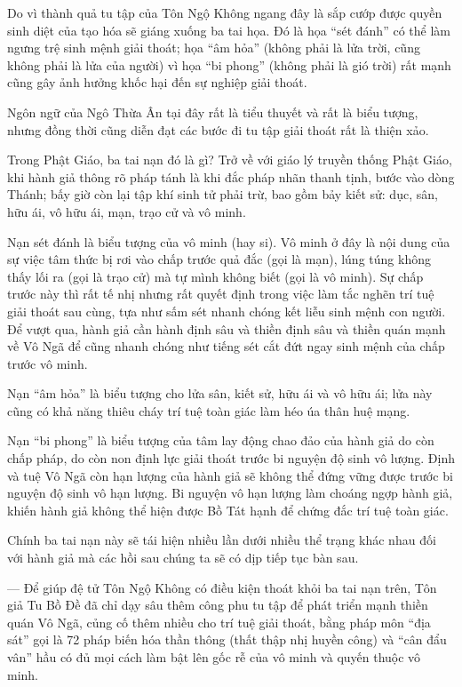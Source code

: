 Do vì thành quả tu tập của Tôn Ngộ Không ngang đây là sắp cướp được quyền sinh diệt của tạo hóa sẽ giáng xuống ba tai họa. Đó là họa ``sét đánh'' có thể làm ngưng trệ sinh mệnh giải thoát; họa ``âm hỏa'' (không phải là lửa trời, cũng không phải là lửa của người) vì họa ``bi phong'' (không phải là gió trời) rất mạnh cũng gây ảnh hưởng khốc hại đến sự nghiệp giải thoát.

Ngôn ngữ của Ngô Thừa Ân tại đây rất là tiểu thuyết và rất là biểu tượng, nhưng đồng thời cũng diễn đạt các bước đi tu tập giải thoát rất là thiện xảo.

Trong Phật Giáo, ba tai nạn đó là gì? Trở về với giáo lý truyền thống Phật Giáo, khi hành giả thông rõ pháp tánh là khi đắc pháp nhãn thanh tịnh, bước vào dòng Thánh; bấy giờ còn lại tập khí sinh tử phải trừ, bao gồm bảy kiết sử: dục, sân, hữu ái, vô hữu ái, mạn, trạo cử và vô minh.

Nạn sét đánh là biểu tượng của vô minh (hay si). Vô minh ở đây là nội dung của sự việc tâm thức bị rơi vào chấp trước quả đắc (gọi là mạn), lúng túng không thấy lối ra (gọi là trạo cử) mà tự mình không biết (gọi là vô minh). Sự chấp trước này thì rất tế nhị nhưng rất quyết định trong việc làm tắc nghẽn trí tuệ giải thoát sau cùng, tựa như sấm sét nhanh chóng kết liễu sinh mệnh con người. Để vượt qua, hành giả cần hành định sâu và thiền định sâu và thiền quán mạnh về Vô Ngã để cũng nhanh chóng như tiếng sét cắt đứt ngay sinh mệnh của chấp trước vô minh.

Nạn ``âm hỏa'' là biểu tượng cho lửa sân, kiết sử, hữu ái và vô hữu ái; lửa này cũng có khả năng thiêu cháy trí tuệ toàn giác làm héo úa thân huệ mạng.

Nạn ``bi phong'' là biểu tượng của tâm lay động chao đảo của hành giả do còn chấp pháp, do còn non định lực giải thoát trước bi nguyện độ sinh vô lượng. Định và tuệ Vô Ngã còn hạn lượng của hành giả sẽ không thể đứng vững được trước bi nguyện độ sinh vô hạn lượng. Bi nguyện vô hạn lượng làm choáng ngợp hành giả, khiến hành giả không thể hiện được Bồ Tát hạnh để chứng đắc trí tuệ toàn giác.

Chính ba tai nạn này sẽ tái hiện nhiều lần dưới nhiều thể trạng khác nhau đối với hành giả mà các hồi sau chúng ta sẽ có dịp tiếp tục bàn sau.

— Để giúp đệ tử Tôn Ngộ Không có điều kiện thoát khỏi ba tai nạn trên, Tôn giả Tu Bồ Đề đã chỉ dạy sâu thêm công phu tu tập để phát triển mạnh thiền quán Vô Ngã, củng cố thêm nhiều cho trí tuệ giải thoát, bằng pháp môn ``địa sát'' gọi là 72 pháp biến hóa thần thông (thất thập nhị huyền công) và ``cân đẩu vân'' hầu có đủ mọi cách làm bật lên gốc rễ của vô minh và quyến thuộc vô minh.

